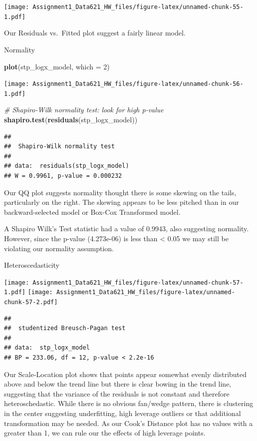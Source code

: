 \documentclass[
]{article}
\newenvironment{Shaded}{\begin{snugshade}}{\end{snugshade}}
\newcommand{\AttributeTok}[1]{\textcolor[rgb]{0.13,0.29,0.53}{#1}}
\newcommand{\CommentTok}[1]{\textcolor[rgb]{0.56,0.35,0.01}{\textit{#1}}}
\newcommand{\DecValTok}[1]{\textcolor[rgb]{0.00,0.00,0.81}{#1}}
\newcommand{\FunctionTok}[1]{\textcolor[rgb]{0.13,0.29,0.53}{\textbf{#1}}}
\newcommand{\NormalTok}[1]{#1}
\begin{document}
\texttt{[image: Assignment1\_Data621\_HW\_files/figure-latex/unnamed-chunk-55-1.pdf]}

Our Residuals vs.~Fitted plot suggest a fairly linear model.

Normality

\begin{Shaded}
\begin{Highlighting}[]
\FunctionTok{plot}\NormalTok{(stp\_logx\_model, }\AttributeTok{which =} \DecValTok{2}\NormalTok{)}
\end{Highlighting}
\end{Shaded}

\texttt{[image: Assignment1\_Data621\_HW\_files/figure-latex/unnamed-chunk-56-1.pdf]}

\begin{Shaded}
\begin{Highlighting}[]
\CommentTok{\# Shapiro{-}Wilk normality test: look for high p{-}value}
\FunctionTok{shapiro.test}\NormalTok{(}\FunctionTok{residuals}\NormalTok{(stp\_logx\_model))}
\end{Highlighting}
\end{Shaded}

\begin{verbatim}
## 
##  Shapiro-Wilk normality test
## 
## data:  residuals(stp_logx_model)
## W = 0.9961, p-value = 0.000232
\end{verbatim}

Our QQ plot suggests normality thought there is some skewing on the
tails, particularly on the right. The skewing appears to be less pitched
than in our backward-selected model or Box-Cox Transformed model.

A Shapiro Wilk's Test statistic had a value of 0.9943, also suggesting
normality. However, since the p-value (4.273e-06) is less than
\textless{} 0.05 we may still be violating our normality assumption.

Heteroscedasticity

\texttt{[image: Assignment1\_Data621\_HW\_files/figure-latex/unnamed-chunk-57-1.pdf]}
\texttt{[image: Assignment1\_Data621\_HW\_files/figure-latex/unnamed-chunk-57-2.pdf]}

\begin{verbatim}
## 
##  studentized Breusch-Pagan test
## 
## data:  stp_logx_model
## BP = 233.06, df = 12, p-value < 2.2e-16
\end{verbatim}

Our Scale-Location plot shows that points appear somewhat evenly
distributed above and below the trend line but there is clear bowing in
the trend line, suggesting that the variance of the residuals is not
constant and therefore heteroschedastic. While there is no obvious
fan/wedge pattern, there is clustering in the center suggesting
underfitting, high leverage outliers or that additional transformation
may be needed. As our Cook's Distance plot has no values with a greater
than 1, we can rule our the effects of high leverage points.
\end{document}
